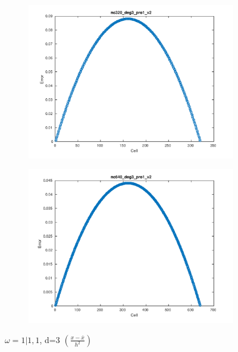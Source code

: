 \documentclass[11pt,a4paper]{article}
\theoremstyle{plain}
\theoremstyle{definition}
\begin{document}
\begin{figure}[H]
\medskip
\begin{subfigure}[b]{0.48\textwidth}
\includegraphics[width=\linewidth]{../../tests_01_01/test_01_01_test9_pro1/output/plots/nc320_deg3_wei111_pro1_v2.pdf}
\end{subfigure}\hspace*{\fill}
\begin{subfigure}[b]{0.48\textwidth}
\includegraphics[width=\linewidth]{../../tests_01_01/test_01_01_test9_pro1/output/plots/nc640_deg3_wei111_pro1_v2.pdf}
\end{subfigure}

\caption{$\omega=1|1,1$, d=3  $\left(\frac{x-\overline{x}}{h^2}\right)$}
\end{figure}
\end{document}
